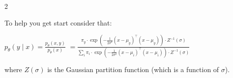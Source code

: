 \clearpage

\LARGE
2
\normalsize
\begin{answer}
    To help you get start consider that:

    \begin{center}
        $p_{\theta}(y \mid x) = \frac{p_{\theta}(x,y)}{p_{\theta}(x)}$
        $= \frac{\pi_{y} \cdot \exp\left(- \frac{1}{2\sigma^2} \left(x-\mu_{y}\right)^{\top}\left(x-\mu_{y}\right)\right) \cdot Z^{-1}(\sigma)}{\sum_{i} \pi_i \cdot \exp\left(- \frac{1}{2\sigma^2}\left(x-\mu_{i}\right)^{\top}\left(x-\mu_{i}\right)\right) \cdot Z^{-1}(\sigma)}$
    \end{center}

    where $Z(\sigma)$ is the Gaussian partition function (which is a function of $\sigma$). 
    







\end{answer}
